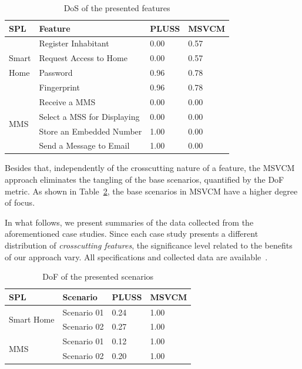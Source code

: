 \documentclass{sig-alternate}
\begin{document}
\begin{table}[thb]
\centering
\caption{DoS of the presented features}
\label{tab:feature-dos}
\begin{small}
\begin{tabular}{p{0.25in}lll} \hline
SPL							&	Feature						& PLUSS	& MSVCM	\\ \hline 
 							&	Register Inhabitant				& 0.00  & 0.57  \\
Smart						&	Request Access to Home			& 0.00  & 0.57  \\ 
Home						&	Password						& 0.96  & 0.78  \\ 
							&	Fingerprint					& 0.96  & 0.78  \\ \hline
\multirow{4}{*}{MMS}	 		&	Receive a MMS				& 0.00  & 0.00  \\ 
							&	Select a MSS for Displaying		& 0.00  & 0.00  \\ 
							& 	Store an Embedded Number		& 1.00  & 0.00  \\
							& 	Send a Message to Email			& 1.00  & 0.00  \\ \hline		
\end{tabular}
\end{small}
\end{table}

Besides that, independently of the crosscutting nature of a feature, the
MSVCM approach eliminates the tangling of the base scenarios, quantified by
the DoF metric. As shown in Table~\ref{tab:scenario-dof}, the base scenarios in
MSVCM have a higher degree of focus. 

In what follows, we present summaries of the data collected from the
aforementioned case studies. Since each case study presents a different distribution of
\emph{crosscutting features}, the significance level related to the benefits
of our approach vary. All specifications and collected data are available~\cite{SPG:site}.


\begin{table}[htb]
\centering
\caption{DoF of the presented scenarios}
\label{tab:scenario-dof}
\begin{small}
\begin{tabular}{llll} \hline
SPL							&	Scenario		& PLUSS	& MSVCM	\\ \hline
\multirow{2}{*}{Smart Home} &	Scenario 01		& 0.24  & 1.00  \\
							&	Scenario 02		& 0.27  & 1.00  \\ \hline
\multirow{2}{*}{MMS} 		&	Scenario 01		& 0.12  & 1.00  \\ 
							&	Scenario 02		& 0.20  & 1.00  \\ \hline
\end{tabular}
\end{small}
\end{table}
\end{document}
